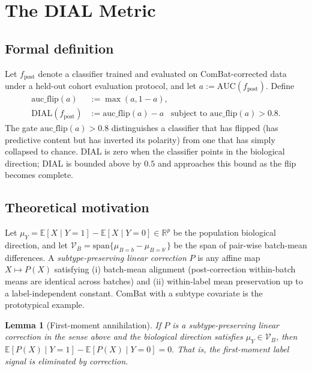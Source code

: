 \documentclass[11pt,a4paper]{article}
\newtheorem{lemma}{Lemma}
\begin{document}
\section{The DIAL Metric}
\label{sec:dial}

\subsection{Formal definition}
Let $f_{\mathrm{post}}$ denote a classifier trained and evaluated on
ComBat-corrected data under a held-out cohort evaluation protocol, and
let $a := \mathrm{AUC}(f_{\mathrm{post}})$. Define
\begin{align*}
  \mathrm{auc\_flip}(a) &:= \max(a, 1-a), \\
  \mathrm{DIAL}(f_{\mathrm{post}}) &:= \mathrm{auc\_flip}(a) - a
  \;\;\; \text{subject to } \mathrm{auc\_flip}(a) > 0.8.
\end{align*}
The gate $\mathrm{auc\_flip}(a) > 0.8$ distinguishes a classifier that
has flipped (has predictive content but has inverted its polarity)
from one that has simply collapsed to chance. DIAL is zero when the
classifier points in the biological direction; DIAL is bounded above
by $0.5$ and approaches this bound as the flip becomes complete.

\subsection{Theoretical motivation}
Let $\mu_Y = \mathbb{E}[X\mid Y{=}1] - \mathbb{E}[X\mid Y{=}0]
\in \mathbb{R}^p$ be the population biological direction, and let
$\mathcal{V}_B = \mathrm{span}\{\mu_{B{=}b} - \mu_{B{=}b'}\}$ be the
span of pair-wise batch-mean differences. A \emph{subtype-preserving
linear correction} $P$ is any affine map $X \mapsto P(X)$ satisfying
(i) batch-mean alignment (post-correction within-batch means are
identical across batches) and (ii) within-label mean preservation up
to a label-independent constant. ComBat \citep{johnson2007combat}
with a subtype covariate is the prototypical example.

\begin{lemma}[First-moment annihilation]
\label{lem:dial}
If $P$ is a subtype-preserving linear correction in the sense above
and the biological direction satisfies $\mu_Y \in \mathcal{V}_B$, then
\(
  \mathbb{E}[P(X) \mid Y = 1] - \mathbb{E}[P(X) \mid Y = 0] = 0.
\)
That is, the first-moment label signal is eliminated by correction.
\end{lemma}
\end{document}
